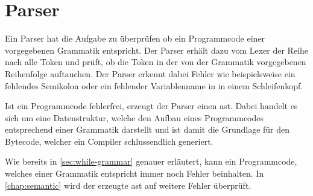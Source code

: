 \section{Parser}
Ein Parser hat die Aufgabe zu überprüfen ob ein Programmcode einer vorgegebenen Grammatik entspricht. Der Parser erhält dazu vom Lexer der Reihe nach alle Token und prüft, ob die Token in der von der Grammatik vorgegebenen Reihenfolge auftauchen. Der Parser erkennt dabei Fehler wie beispielsweise ein fehlendes Semikolon oder ein fehlender Variablenname in in einem Schleifenkopf. 

Ist ein Programmcode fehlerfrei, erzeugt der Parser einen \ac{ast}. Dabei handelt es sich um eine Datenstruktur, welche den Aufbau eines Programmcodes entsprechend einer Grammatik darstellt und ist damit die Grundlage für den Bytecode, welcher ein Compiler schlussendlich generiert. 

Wie bereits in \cref{sec:while-grammar} genauer erläutert, kann ein Programmcode, welches einer Grammatik entspricht immer noch Fehler beinhalten. In \cref{chap:semantic} wird der erzeugte \ac{ast} auf weitere Fehler überprüft.
